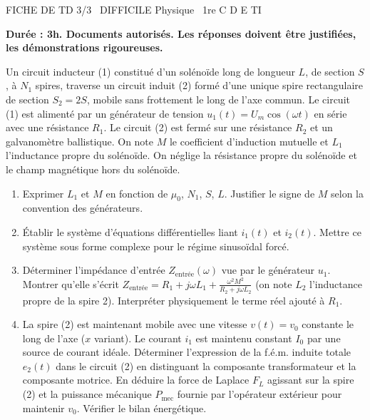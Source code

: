 \documentclass[11pt]{article}
\begin{document}
\begin{tcolorbox}[enhanced,colback=popink,colframe=popink,arc=10pt,boxrule=0pt,left=12pt,right=12pt,top=9pt,bottom=9pt]
{\color{white}\popxbold\small FICHE DE TD 3/3 \textbullet\ DIFFICILE \hfill Physique \textbullet\ 1re C D E TI\par}
\end{tcolorbox}
\vspace{4pt}
\textbf{Durée : 3h. Documents autorisés. Les réponses doivent être justifiées, les démonstrations rigoureuses.}

\begin{exercice}
Un circuit inducteur (1) constitué d'un solénoïde long de longueur $L$, de section $S$, à $N_1$ spires, traverse un circuit induit (2) formé d'une unique spire rectangulaire de section $S_2 = 2S$, mobile sans frottement le long de l'axe commun. Le circuit (1) est alimenté par un générateur de tension $u_1(t) = U_m \cos(\omega t)$ en série avec une résistance $R_1$. Le circuit (2) est fermé sur une résistance $R_2$ et un galvanomètre ballistique. On note $M$ le coefficient d'induction mutuelle et $L_1$ l'inductance propre du solénoïde. On néglige la résistance propre du solénoïde et le champ magnétique hors du solénoïde.
\begin{enumerate}
    \item Exprimer $L_1$ et $M$ en fonction de $\mu_0$, $N_1$, $S$, $L$. Justifier le signe de $M$ selon la convention des générateurs.
    \item Établir le système d'équations différentielles liant $i_1(t)$ et $i_2(t)$. Mettre ce système sous forme complexe pour le régime sinusoïdal forcé.
    \item Déterminer l'impédance d'entrée $Z_{\text{entrée}}(\omega)$ vue par le générateur $u_1$. Montrer qu'elle s'écrit $Z_{\text{entrée}} = R_1 + j\omega L_1 + \frac{\omega^2 M^2}{R_2 + j\omega L_2}$ (on note $L_2$ l'inductance propre de la spire 2). Interpréter physiquement le terme réel ajouté à $R_1$.
    \item La spire (2) est maintenant mobile avec une vitesse $v(t) = v_0$ constante le long de l'axe ($x$ variant). Le courant $i_1$ est maintenu constant $I_0$ par une source de courant idéale. Déterminer l'expression de la f.é.m. induite totale $e_2(t)$ dans le circuit (2) en distinguant la composante transformateur et la composante motrice. En déduire la force de Laplace $F_L$ agissant sur la spire (2) et la puissance mécanique $P_{\text{mec}}$ fournie par l'opérateur extérieur pour maintenir $v_0$. Vérifier le bilan énergétique.
\end{enumerate}
\end{exercice}
\end{document}

